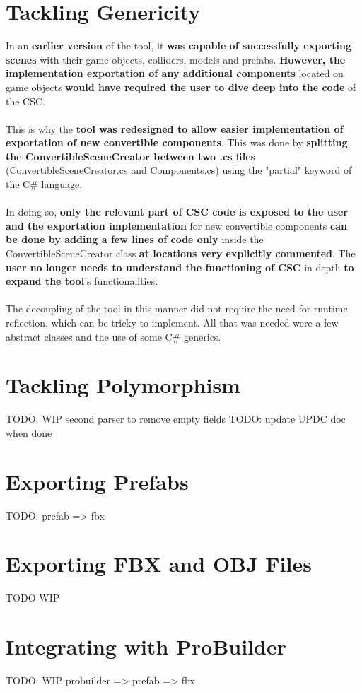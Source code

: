 \documentclass[12pt,a4paper]{article}
\begin{document}
\section{Tackling Genericity}
In an \textbf{earlier version} of the tool, it \textbf{was capable of successfully exporting scenes} with their game objects, colliders, models and prefabs. \textbf{However, the implementation exportation of any additional components} located on game objects \textbf{would have required the user to dive deep into the code} of the CSC.\\\\
This is why the \textbf{tool was redesigned to allow easier implementation of exportation of new convertible components}. This was done by \textbf{splitting the ConvertibleSceneCreator between two .cs files} (ConvertibleSceneCreator.cs and Components.cs) using the "partial" keyword of the C\# language.\\\\ In doing so, \textbf{only the relevant part of CSC code is exposed to the user and the exportation implementation} for new convertible components \textbf{can be done by adding a few lines of code only} inside the ConvertibleSceneCreator class \textbf{at locations very explicitly commented}. The \textbf{user no longer needs to understand the functioning of CSC} in depth \textbf{to expand the tool}'s functionalities.\\\\
The decoupling of the tool in this manner did not require the need for runtime reflection, which can be tricky to implement. All that was needed were a few abstract classes and the use of some C\# generics.

\section{Tackling Polymorphism}
TODO: WIP second parser to remove empty fields TODO: update UPDC doc when done

\section{Exporting Prefabs}
TODO: prefab => fbx

\section{Exporting FBX and OBJ Files}
TODO WIP

\section{Integrating with ProBuilder}
TODO: WIP probuilder => prefab => fbx
\end{document}
